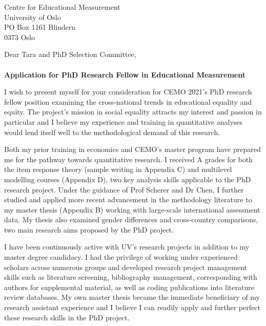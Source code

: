 \documentclass[a4paper,11pt]{letter} %
\date{Friday 28 May 2021}
\begin{document}

\begin{letter}{Centre for Educational Measurement \\ University of Oslo \\ PO Box 1161 Blindern \\ 0373 Oslo} %


\opening{
    Dear Tara and PhD Selection Committee,\\
    \\
    \textbf{Application for PhD Research Fellow in Educational Measurement}
    \smallskip
}

I wish to present myself for your consideration for CEMO 2021's PhD research fellow position examining the cross-national trends in educational equality and equity. The project's mission in social equality attracts my interest and passion in particular and I believe my experience and training in quantitative analyses would lend itself well to the methodological demand of this research.

Both my prior training in economics and CEMO's master program have prepared me for the pathway towards quantitative research. I received A grades for both the item response theory (sample writing in Appendix C) and multilevel modelling courses (Appendix D), two key analysis skills applicable to the PhD research project. Under the guidance of Prof Scherer and Dr Chen, I further studied and applied more recent advancement in the methodology literature to my master thesis (Appendix B) working with large-scale international assessment data. My thesis also examined gender differences and cross-country comparisons, two main research aims proposed by the PhD project.

I have been continuously active with UV's research projects in addition to my master degree candidacy. I had the privilege of working under experienced scholars across numerous groups and developed research project management skills such as literature screening, bibliography management, corresponding with authors for supplemental material, as well as coding publications into literature review databases. My own master thesis became the immediate beneficiary of my research assistant experience and I believe I can readily apply and further perfect these research skills in the PhD project.


\end{letter}
\end{document}

